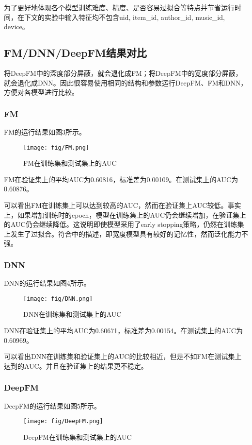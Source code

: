 \documentclass[]{article}
\begin{document}
为了更好地体现各个模型训练难度、精度、是否容易过拟合等特点并节省运行时间，在下文的实验中输入特征均不包含uid, item\_id, author\_id, music\_id, device。

\subsection{FM/DNN/DeepFM结果对比}
将DeepFM中的深度部分屏蔽，就会退化成FM；将DeepFM中的宽度部分屏蔽，就会退化成DNN。因此很容易使用相同的结构和参数运行DeepFM、FM和DNN，方便对各模型进行比较。

\subsubsection{FM}
FM的运行结果如图3所示。

\begin{figure}[htbp]
	\centering
	\texttt{[image: fig/FM.png]}
	\caption{FM在训练集和测试集上的AUC}
\end{figure}

FM在验证集上的平均AUC为0.60816，标准差为0.00109。在测试集上的AUC为0.60876。

可以看出FM在训练集上可以达到较高的AUC，然而在验证集上AUC较低。事实上，如果增加训练时的epoch，模型在训练集上的AUC仍会继续增加，在验证集上的AUC仍会继续降低。这说明即使模型采用了early stopping策略，仍然在训练集上发生了过拟合。符合\cite{Cheng2016}中的描述，即宽度模型具有较好的记忆性，然而泛化能力不强。

\subsubsection{DNN}
DNN的运行结果如图4所示。

\begin{figure}[htbp]
	\centering
	\texttt{[image: fig/DNN.png]}
	\caption{DNN在训练集和测试集上的AUC}
\end{figure}

DNN在验证集上的平均AUC为0.60671，标准差为0.00154。在测试集上的AUC为0.60969。

可以看出DNN在训练集和验证集上的AUC的比较相近，但是不如FM在测试集上达到的AUC。并且在验证集上的结果更不稳定。

\subsubsection{DeepFM}
DeepFM的运行结果如图5所示。

\begin{figure}[htbp]
	\centering
	\texttt{[image: fig/DeepFM.png]}
	\caption{DeepFM在训练集和测试集上的AUC}
\end{figure}
\end{document}
